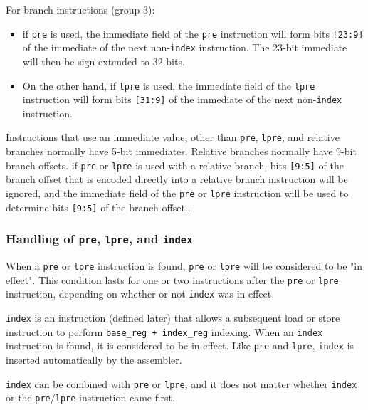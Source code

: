 \documentclass{article}
\begin{document}
	For branch instructions (group 3):
	\begin{itemize}
		\item if \texttt{pre} is used, the
		immediate field of the \texttt{pre} instruction will form bits
		\texttt{[23:9]} of the immediate of the next non-\texttt{index}
		instruction. The 23-bit immediate will then be sign-extended to 32
		bits.

		\item On the other hand, if \texttt{lpre} is used, the immediate
		field of the \texttt{lpre} instruction will form bits
		\texttt{[31:9]} of the immediate of the next non-\texttt{index}
		instruction.
	\end{itemize}

	Instructions that use an immediate value, other than \texttt{pre},
	\texttt{lpre}, and relative branches normally have 5-bit immediates.
	Relative branches normally have 9-bit branch offsets. if \texttt{pre}
	or \texttt{lpre} is used with a relative branch, bits \texttt{[9:5]} of
	the branch offset that is encoded directly into a relative branch
	instruction will be ignored, and the immediate field of the
	\texttt{pre} or \texttt{lpre} instruction will be used to determine
	bits \texttt{[9:5]} of the branch offset..

	\subsubsection{Handling of \texttt{pre}, \texttt{lpre}, and
	\texttt{index}}

	When a \texttt{pre} or \texttt{lpre} instruction is found, \texttt{pre}
	or \texttt{lpre} will be considered to be "in effect". This condition
	lasts for one or two instructions after the \texttt{pre} or
	\texttt{lpre} instruction, depending on whether or not \texttt{index}
	was in effect.

	\texttt{index} is an instruction (defined later) that allows a
	subsequent load or store instruction to perform \texttt{base\_reg +
	index\_reg} indexing. When an \texttt{index} instruction is found, it
	is considered to be in effect. Like \texttt{pre} and \texttt{lpre},
	\texttt{index} is inserted automatically by the assembler.

	\texttt{index} can be combined with \texttt{pre} or \texttt{lpre}, and
	it does not matter whether \texttt{index} or the
	\texttt{pre}/\texttt{lpre} instruction came first.

\end{document}

